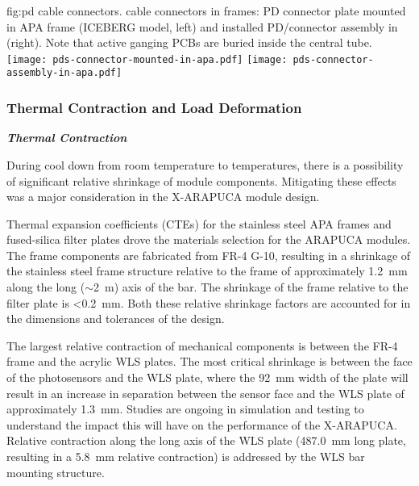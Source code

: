 
\begin{dunefigure}{fig:pd cable connectors.}
{ cable connectors in  frames: PD connector plate mounted in APA frame (ICEBERG model, left) and installed PD/connector assembly in  (right).  Note that active ganging PCBs are buried inside the central tube.}
	\texttt{[image: pds-connector-mounted-in-apa.pdf]}
	\texttt{[image: pds-connector-assembly-in-apa.pdf]}
\end{dunefigure}

\subsubsection{Thermal Contraction and Load Deformation}


\textit{\bf Thermal Contraction}

During cool down from room temperature to  temperatures, there is a possibility of significant relative shrinkage of module components.  Mitigating these effects was a major consideration in the X-ARAPUCA module design.

Thermal expansion coefficients (CTEs) for the stainless steel APA frames and fused-silica filter plates drove the materials selection for the ARAPUCA modules.  The frame components are fabricated from FR-4 G-10, resulting in a shrinkage of the stainless steel frame structure relative to the frame of approximately \SI{1.2}{mm} along the long ($\sim$\SI{2}{m}) axis of the bar.  The shrinkage of the frame relative to the filter plate is <\SI{0.2}{mm}.  Both these relative shrinkage factors are accounted for in the dimensions and tolerances of the design.

The largest relative contraction of mechanical components is between the FR-4 frame and the acrylic WLS plates. The most critical shrinkage is between the face of the photosensors and the WLS plate, where the \SI{92}{mm} width of the plate will result in an increase in separation between the sensor face and the WLS plate of approximately \SI{1.3}{mm}.  Studies are ongoing in simulation and testing to understand the impact this will have on the performance of the X-ARAPUCA.  Relative contraction along the long axis of the WLS plate (\SI{487.0}{mm} long plate, resulting in a \SI{5.8}{mm} relative contraction) is addressed by the WLS bar mounting structure.

